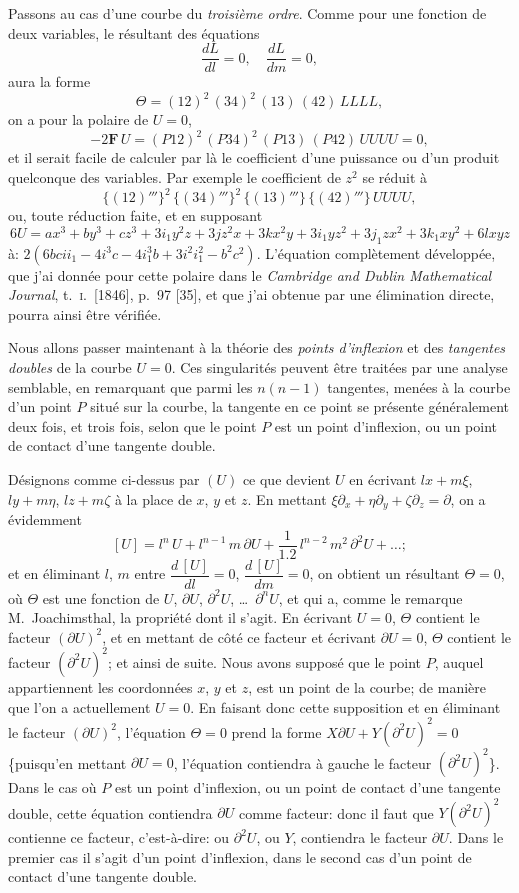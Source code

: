 \documentclass[11pt,a4paper]{book}
\begin{document}
Passons au cas d'une courbe du \textit{troisi\`eme ordre}. Comme pour une fonction de deux variables, le r\'esultant des \'equations
\[
\frac{dL}{dl} = 0, \quad \frac{dL}{dm} = 0,
\]
aura la forme
\[
\Theta = (12)^2\,(34)^2\,(13)\,(42)\, LLLL,
\]
on a pour la polaire de $U = 0$,
\[
-2\mathbf{F}\,U = (P12)^2\,(P34)^2\,(P13)\,(P42)\,UUUU = 0,
\]
et il serait facile de calculer par l\`a le coefficient d'une puissance ou d'un produit quelconque des variables. Par exemple le coefficient de $z^2$ se r\'eduit \`a
\[
\{(12)'''\}^2\,\{(34)'''\}^2\,\{(13)'''\}\,\{(42)'''\}\,UUUU,
\]
ou, toute r\'eduction faite, et en supposant
\[
6U = ax^3 + by^3 + cz^3 + 3i_1 y^2z + 3jz^2x + 3kx^2y + 3i_1 yz^2 + 3j_1 zx^2 + 3k_1 xy^2 + 6lxyz
\]
\`a: $2(6bcii_1 - 4i^3c - 4i_1^3b + 3i^2i_1^2 - b^2c^2)$. L'\'equation compl\`etement d\'evelopp\'ee, que j'ai donn\'ee pour cette polaire dans le \textit{Cambridge and Dublin Mathematical Journal}, t.~\textsc{i}.~[1846], p.~97 [35], et que j'ai obtenue par une \'elimination directe, pourra ainsi \^etre v\'erifi\'ee.

Nous allons passer maintenant \`a la th\'eorie des \textit{points d'inflexion} et des \textit{tangentes doubles} de la courbe $U = 0$. Ces singularit\'es peuvent \^etre trait\'ees par une analyse semblable, en remarquant que parmi les $n(n-1)$ tangentes, men\'ees \`a la courbe d'un point $P$ situ\'e sur la courbe, la tangente en ce point se pr\'esente g\'en\'eralement deux fois, et trois fois, selon que le point $P$ est un point d'inflexion, ou un point de contact d'une tangente double.

D\'esignons comme ci-dessus par $(U)$ ce que devient $U$ en \'ecrivant $lx + m\xi$, $ly + m\eta$, $lz + m\zeta$ \`a la place de $x$, $y$ et $z$. En mettant $\xi\partial_x + \eta\partial_y + \zeta\partial_z = \partial$, on a \'evidemment
\[
[U] = l^n\,U + l^{n-1}\,m\,\partial U + \frac{1}{1.2}\,l^{n-2}\,m^2\,\partial^2 U + \ldots;
\]
et en \'eliminant $l$, $m$ entre $\dfrac{d\,[U]}{dl} = 0$, $\dfrac{d\,[U]}{dm} = 0$, on obtient un r\'esultant $\Theta = 0$, o\`u $\Theta$ est une fonction de $U$, $\partial U$, $\partial^2 U$, \ldots\ $\partial^n U$, et qui a, comme le remarque M.~Joachimsthal, la propri\'et\'e dont il s'agit. En \'ecrivant $U = 0$, $\Theta$ contient le facteur $(\partial U)^2$, et en mettant de c\^ot\'e ce facteur et \'ecrivant $\partial U = 0$, $\Theta$ contient le facteur $(\partial^2 U)^2$; et ainsi de suite. Nous avons suppos\'e que le point $P$, auquel appartiennent les coordonn\'ees $x$, $y$ et $z$, est un point de la courbe; de mani\`ere que l'on a actuellement $U = 0$. En faisant donc cette supposition et en \'eliminant le facteur $(\partial U)^2$, l'\'equation $\Theta = 0$ prend la forme $X\partial U + Y(\partial^2 U)^2 = 0$ \{puisqu'en mettant $\partial U = 0$, l'\'equation contiendra \`a gauche le facteur $(\partial^2 U)^2$\}. Dans le cas o\`u $P$ est un point d'inflexion, ou un point de contact d'une tangente double, cette \'equation contiendra $\partial U$ comme facteur: donc il faut que $Y(\partial^2 U)^2$ contienne ce facteur, c'est-\`a-dire: ou $\partial^2 U$, ou $Y$, contiendra le facteur $\partial U$. Dans le premier cas il s'agit d'un point d'inflexion, dans le second cas d'un point de contact d'une tangente double.
\end{document}
